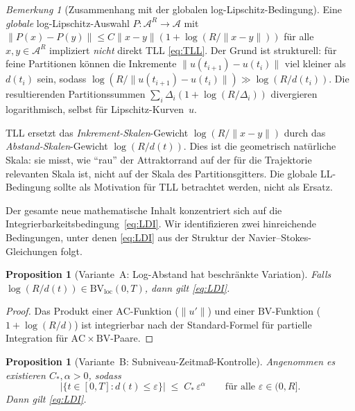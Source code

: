 \documentclass[12pt,a4paper]{article}
\theoremstyle{definition}
\theoremstyle{plain}
\newtheorem{proposition}[definition]{Proposition}
\theoremstyle{remark}
\newtheorem{remark}[definition]{Bemerkung}
\begin{document}
\begin{remark}[Zusammenhang mit der globalen log-Lipschitz-Bedingung]
\label{rem:global-LL}
Eine \emph{globale} log-Lipschitz-Auswahl
$P : \mathcal{A}^R \to \mathcal{A}$ mit
$\|P(x)-P(y)\| \le C\|x-y\|(1+\log(R/\|x-y\|))$
für alle $x,y \in \mathcal{A}^R$ impliziert \emph{nicht} direkt TLL
\eqref{eq:TLL}. Der Grund ist strukturell: für feine Partitionen
können die Inkremente $\|u(t_{i+1})-u(t_i)\|$ viel kleiner als
$d(t_i)$ sein, sodass $\log(R/\|u(t_{i+1})-u(t_i)\|) \gg \log(R/d(t_i))$.
Die resultierenden Partitionssummen
$\sum_i \Delta_i(1+\log(R/\Delta_i))$ divergieren logarithmisch,
selbst für Lipschitz-Kurven~$u$.

TLL ersetzt das \emph{Inkrement-Skalen}-Gewicht
$\log(R/\|x-y\|)$ durch das \emph{Abstand-Skalen}-Gewicht
$\log(R/d(t))$. Dies ist die geometrisch natürliche Skala: sie misst,
wie ``rau'' der Attraktorrand auf der für die Trajektorie relevanten Skala ist,
nicht auf der Skala des Partitionsgitters.
Die globale LL-Bedingung sollte als Motivation für TLL betrachtet werden,
nicht als Ersatz.
\end{remark}

Der gesamte neue mathematische Inhalt konzentriert sich auf die
Integrierbarkeitsbedingung~\eqref{eq:LDI}. Wir identifizieren zwei
hinreichende Bedingungen, unter denen \eqref{eq:LDI} aus der
Struktur der Navier--Stokes-Gleichungen folgt.

\begin{proposition}[Variante~A: Log-Abstand hat beschränkte Variation]
\label{prop:LDI-A}
Falls $\log(R/d(t)) \in \mathrm{BV}_{\mathrm{loc}}(0,T)$, dann
gilt \eqref{eq:LDI}.
\end{proposition}

\begin{proof}
Das Produkt einer $\mathrm{AC}$-Funktion ($\|u'\|$) und einer $\mathrm{BV}$-Funktion ($1 + \log(R/d)$) ist integrierbar nach der Standard-Formel
für partielle Integration für $\mathrm{AC}\times\mathrm{BV}$-Paare.
\end{proof}

\begin{proposition}[Variante~B: Subniveau-Zeitmaß-Kontrolle]
\label{prop:LDI-B}
Angenommen es existieren $C_*, \alpha > 0$, sodass
\begingroup
\renewcommand{\theequation}{STC}
\renewcommand{\theHequation}{STC}
\begin{equation}\label{eq:STC}
  \bigl|\{t \in [0,T] : d(t) \le \varepsilon\}\bigr|
  \;\le\;
  C_*\,\varepsilon^\alpha
  \qquad \text{für alle } \varepsilon \in (0, R].
\end{equation}
\endgroup
Dann gilt \eqref{eq:LDI}.
\end{proposition}
\end{document}
